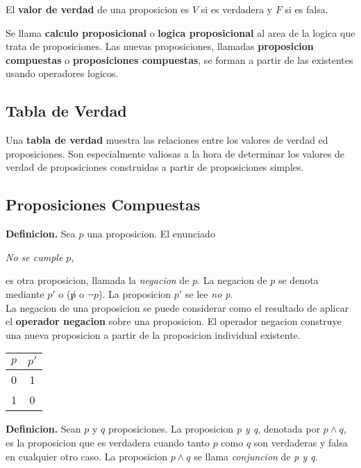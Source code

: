 \documentclass[]{article}
\begin{document}
El \textbf{valor de verdad} de una proposicion es $V$ si es verdadera y $F$ si es falsa.

Se llama \textbf{calculo proposicional} o \textbf{logica proposicional} al area de la logica que trata de proposiciones. Las nuevas proposiciones, llamadas \textbf{proposicion compuestas} o \textbf{proposiciones compuestas}, se forman a partir de las existentes usando operadores logicos.

\subsection*{Tabla de Verdad}

Una \textbf{tabla de verdad} muestra las relaciones entre los valores de verdad ed proposiciones. Son especialmente valiosas a la hora de determinar los valores de verdad de proposiciones construidas a partir de proposiciones simples.

\subsection*{Proposiciones Compuestas}

\textbf{Definicion.}  Sea $p$ una proposicion. El enunciado
		\begin{center}
			\textit{No se cumple $p$},
		\end{center}
	es otra proposicion, llamada la \textit{negacion} de $p$. La negacion de $p$ se denota mediante $p'$ o ($\not p$ o $\neg p$). La proposicion $p'$ se lee \textit{no p}.\\

	La negacion de una proposicion se puede considerar como el resultado de aplicar el \textbf{operador negacion} sobre una proposicion. El operador negacion construye una nueva proposicion a partir de la proposicion individual existente. 

	\begin{table}[H]
		\begin{center}
			\label{tab:and}
			\begin{tabular}{c|c}
				$p$ & $p'$ \\
				\hline
				0 & 1 \\
				1 & 0 
			\end{tabular}
		\end{center}
	\end{table}

	\textbf{Definicion.} Sean $p$ y $q$ proposiciones. La proposicion \textit{p y q}, denotada por $p \wedge q$, es la proposicion que es verdadera cuando tanto $p$ como $q$ son verdaderas y falsa en cualquier otro caso. La proposicion $p \wedge q$ se llama \textit{conjuncion} de \textit{p y q}.\\
\end{document}
